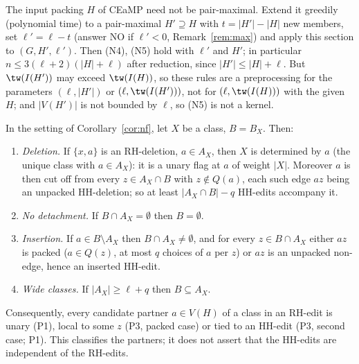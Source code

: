 \begin{remark}\label{rem:ext}
The input packing $H$ of CEaMP need not be pair-maximal. Extend it greedily (polynomial time) to a pair-maximal $H'\supseteq H$ with $t=|H'|-|H|$ new members, set $\ell'=\ell-t$ (answer NO if $\ell'<0$, Remark~\ref{rem:max}) and apply this section to $(G,H',\ell')$. Then (N4), (N5) hold with $\ell'$ and $H'$; in particular $n\le3(\ell+2)(|H|+\ell)$ after reduction, since $|H'|\le|H|+\ell$. But $\tw(I(H'))$ may exceed $\tw(I(H))$, so these rules are a preprocessing for the parameters $(\ell,|H'|)$ or $(\ell,\tw(I(H')))$, not for $(\ell,\tw(I(H)))$ with the given $H$; and $|V(H')|$ is not bounded by $\ell$, so (N5) is not a kernel.
\end{remark}

\begin{proposition}\label{prop:pointer}
In the setting of Corollary~\ref{cor:nf}, let $X$ be a class, $B=B_X$. Then:
\begin{enumerate}
\item[(P1)] \emph{Deletion.} If $\{x,a\}$ is an RH-deletion, $a\in A_X$, then $X$ is determined by $a$ (the unique class with $a\in A_X$): it is a unary flag at $a$ of weight $|X|$. Moreover $a$ is then cut off from every $z\in A_X\cap B$ with $z\notin Q(a)$, each such edge $az$ being an unpacked HH-deletion; so at least $|A_X\cap B|-q$ HH-edits accompany it.
\item[(P2)] \emph{No detachment.} If $B\cap A_X=\emptyset$ then $B=\emptyset$.
\item[(P3)] \emph{Insertion.} If $a\in B\setminus A_X$ then $B\cap A_X\ne\emptyset$, and for every $z\in B\cap A_X$ either $az$ is packed ($a\in Q(z)$, at most $q$ choices of $a$ per $z$) or $az$ is an unpacked non-edge, hence an inserted HH-edit.
\item[(P4)] \emph{Wide classes.} If $|A_X|\ge\ell+q$ then $B\subseteq A_X$.
\end{enumerate}
Consequently, every candidate partner $a\in V(H)$ of a class in an RH-edit is unary (P1), local to some $z$ (P3, packed case) or tied to an HH-edit (P3, second case; P1). This classifies the partners; it does not assert that the HH-edits are independent of the RH-edits.
\end{proposition}
